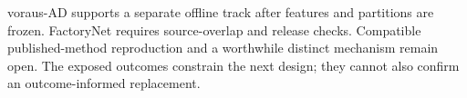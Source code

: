 voraus-AD supports a separate offline track after features and partitions are frozen. FactoryNet requires source-overlap and release checks. Compatible published-method reproduction and a worthwhile distinct mechanism remain open. The exposed outcomes constrain the next design; they cannot also confirm an outcome-informed replacement.